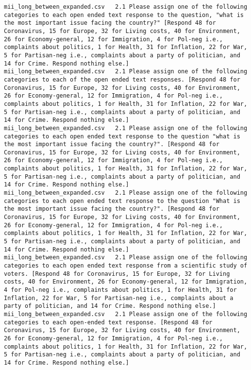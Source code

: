 \begin{lstlisting}[label=lst:promptvariants]
mii_long_between_expanded.csv	2.1	Please assign one of the following categories to each open ended text response to the question, "what is the most important issue facing the country?" [Respond 48 for Coronavirus, 15 for Europe, 32 for Living costs, 40 for Environment, 26 for Economy-general, 12 for Immigration, 4 for Pol-neg i.e., complaints about politics, 1 for Health, 31 for Inflation, 22 for War, 5 for Partisan-neg i.e., complaints about a party of politician, and 14 for Crime. Respond nothing else.]
mii_long_between_expanded.csv	2.1	Please assign one of the following categories to each of the open ended text responses. [Respond 48 for Coronavirus, 15 for Europe, 32 for Living costs, 40 for Environment, 26 for Economy-general, 12 for Immigration, 4 for Pol-neg i.e., complaints about politics, 1 for Health, 31 for Inflation, 22 for War, 5 for Partisan-neg i.e., complaints about a party of politician, and 14 for Crime. Respond nothing else.]
mii_long_between_expanded.csv	2.1	Please assign one of the following categories to each open ended text response to the question "what is the most important issue facing the country?". [Respond 48 for Coronavirus, 15 for Europe, 32 for Living costs, 40 for Environment, 26 for Economy-general, 12 for Immigration, 4 for Pol-neg i.e., complaints about politics, 1 for Health, 31 for Inflation, 22 for War, 5 for Partisan-neg i.e., complaints about a party of politician, and 14 for Crime. Respond nothing else.]
mii_long_between_expanded.csv	2.1	Please assign one of the following categories to each open ended text response to the question "What is the most important issue facing the country?". [Respond 48 for Coronavirus, 15 for Europe, 32 for Living costs, 40 for Environment, 26 for Economy-general, 12 for Immigration, 4 for Pol-neg i.e., complaints about politics, 1 for Health, 31 for Inflation, 22 for War, 5 for Partisan-neg i.e., complaints about a party of politician, and 14 for Crime. Respond nothing else.]
mii_long_between_expanded.csv	2.1	Please assign one of the following categories to each open ended text response from a scientific study of voters. [Respond 48 for Coronavirus, 15 for Europe, 32 for Living costs, 40 for Environment, 26 for Economy-general, 12 for Immigration, 4 for Pol-neg i.e., complaints about politics, 1 for Health, 31 for Inflation, 22 for War, 5 for Partisan-neg i.e., complaints about a party of politician, and 14 for Crime. Respond nothing else.]
mii_long_between_expanded.csv	2.1	Please assign one of the following categories to each open-ended text response. [Respond 48 for Coronavirus, 15 for Europe, 32 for Living costs, 40 for Environment, 26 for Economy-general, 12 for Immigration, 4 for Pol-neg i.e., complaints about politics, 1 for Health, 31 for Inflation, 22 for War, 5 for Partisan-neg i.e., complaints about a party of politician, and 14 for Crime. Respond nothing else.]

\end{lstlisting}
